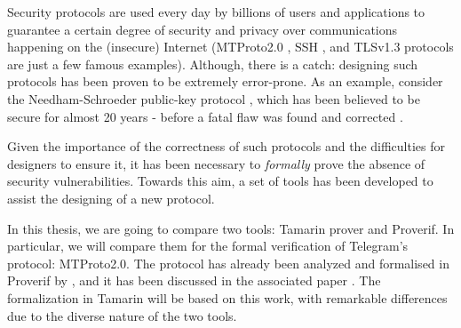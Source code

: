 \label{section:introduction}

Security protocols are used every day by billions of users and applications to guarantee a certain degree of security and privacy over communications happening on the (insecure) Internet (MTProto2.0 \cite{Telegram-MTProto2.0}, SSH \cite{rfc4251}, and TLSv1.3 \cite{TLSv1.3_specs} protocols are just a few famous examples). Although, there is a catch: designing such protocols has been proven to be extremely error-prone. As an example, consider the Needham-Schroeder public-key protocol \cite{NSPK}, which has been believed to be secure for almost 20 years - before a fatal flaw was found and corrected \cite{NSPK_LoweGavin}.

Given the importance of the correctness of such protocols and the difficulties for designers to ensure it, it has been necessary to \textit{formally} prove the absence of security vulnerabilities. Towards this aim, a set of tools has been developed to assist the designing of a new protocol.

In this thesis, we are going to compare two tools: Tamarin prover and Proverif. In particular, we will compare them for the formal verification of Telegram's protocol: MTProto2.0. The protocol has already been analyzed and formalised in Proverif by \MMNV{} \cite{MTProto2-Proverif-impl}, and it has been discussed in the associated paper \cite{MTProto2-Proverif}. The formalization in Tamarin will be based on this work, with remarkable differences due to the diverse nature of the two tools.
